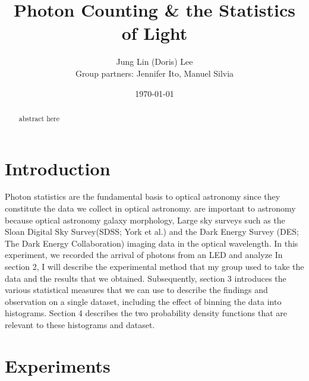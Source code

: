 \documentclass[12pt]{article}
\title{Photon Counting \& the Statistics of Light}
\author{Jung Lin (Doris) Lee\\ Group partners: Jennifer Ito, Manuel Silvia}
\date{\today}
\begin{document}
\maketitle
\begin{abstract}
abstract here
\end{abstract}
\section{Introduction\label{intro}}
\indent Photon statistics are the fundamental basis to optical astronomy since they constitute the data we collect in optical astronomy. 
are important to astronomy because 
optical astronomy 
galaxy morphology, 
Large sky surveys such as the Sloan Digital Sky Survey(SDSS; York et al.) and the Dark Energy Survey (DES; The Dark Energy Collaboration) imaging data in the optical wavelength.
\indent In this experiment, we recorded the arrival of photons from an LED and analyze
 In section 2, I will describe the experimental method that my group used to take the data and the results that we obtained. Subsequently, section 3 introduces the various statistical measures that we can use to describe the findings and observation on  a single dataset, including the effect of binning the data into histograms. Section 4 describes the two probability density functions that are relevant to these histograms and dataset.
\section{Experiments\label{experiment}}
\end{document}
